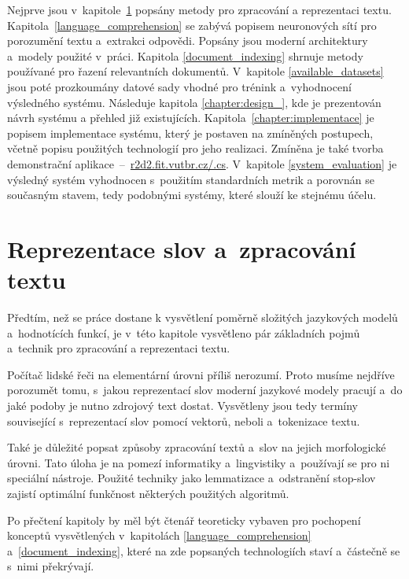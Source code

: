 Nejprve jsou v~kapitole~\ref{text_processing} popsány metody pro zpracování a reprezentaci textu. Kapi\-tola~\ref{language_comprehension} se zabývá popisem neuronových sítí pro porozumění textu a~extrakci odpovědi. Popsány jsou moderní architektury a~modely použité v~práci. Kapitola \ref{document_indexing} shrnuje metody používané pro řazení relevantních dokumentů. V~kapitole \ref{available_datasets} jsou poté prozkoumány datové sady vhodné pro trénink a~vyhodnocení výsledného systému. Následuje kapitola \ref{chapter:design_}, kde je prezentován návrh systému a přehled již existujících. Kapitola~\ref{chapter:implementace} je popisem implementace systému, který je postaven na zmíněných postupech, včetně popisu použitých technologií pro jeho realizaci. Zmíněna je také tvorba demonstrační apli\-kace\mbox{ -- \href{http://r2d2.fit.vutbr.cz/.cs}{r2d2.fit.vutbr.cz/.cs}}. V~kapitole \ref{system_evaluation} je výsledný systém vyhodnocen s~použitím standardních metrik a porovnán se současným stavem, tedy podobnými systémy, které slouží ke stejnému účelu.


\chapter{Reprezentace slov a~zpracování textu}
\label{text_processing}

Předtím, než se práce dostane k vysvětlení poměrně složitých jazykových modelů a~hodnotících funkcí, je v~této kapitole vysvětleno pár základních pojmů a~technik pro zpracování a reprezentaci textu.\par 
Počítač lidské řeči na elementární úrovni příliš nerozumí. Proto musíme nejdříve porozumět tomu, s~jakou reprezentací slov moderní jazykové modely pracují a~do jaké podoby je nutno zdrojový text dostat. Vysvětleny jsou tedy termíny související s~reprezentací slov pomocí vektorů, neboli  a~tokenizace textu.\par 
Také je důležité popsat způsoby zpracování textů a~slov na jejich morfologické úrovni. Tato úloha je na pomezí informatiky a~lingvistiky a~používají se pro ni speciální nástroje. Použité techniky jako lemmatizace a~odstranění stop-slov zajistí optimální funkčnost některých použitých algoritmů.\par
Po přečtení kapitoly by měl být čtenář teoreticky vybaven pro pochopení konceptů vysvětlených v~kapitolách \ref{language_comprehension} a~\ref{document_indexing}, které na zde popsaných technologiích staví a~částečně se s~nimi překrývají.

